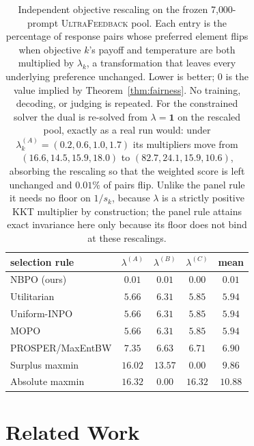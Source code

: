 \documentclass{article}
\theoremstyle{remark}
\theoremstyle{plain}
\newcommand{\NBPO}{\textsc{NBPO}}
\begin{document}
\begin{table}[htbp]
\centering\footnotesize
\setlength{\tabcolsep}{4.0pt}
\caption{Independent objective rescaling on the frozen 7{,}000-prompt \textsc{UltraFeedback} pool. Each entry is the percentage of response pairs whose preferred element flips when objective $k$'s payoff and temperature are both multiplied by $\lambda_k$, a transformation that leaves every underlying preference unchanged. Lower is better; $0$ is the value implied by Theorem~\ref{thm:fairness}. No training, decoding, or judging is repeated. For the constrained solver the dual is re-solved from $\lambda=\mathbf 1$ on the rescaled pool, exactly as a real run would: under $\lambda_k^{(A)}=(0.2,0.6,1.0,1.7)$ its multipliers move from $(16.6,14.5,15.9,18.0)$ to $(82.7,24.1,15.9,10.6)$, absorbing the rescaling so that the weighted score is left unchanged and $0.01\%$ of pairs flip. Unlike the panel rule it needs no floor on $1/s_k$, because $\lambda$ is a strictly positive KKT multiplier by construction; the panel rule attains exact invariance here only because its floor does not bind at these rescalings.}
\label{tab:uf-scale-covariance}
\begin{tabular}{lcccc}
\toprule
selection rule & $\lambda^{(A)}$ & $\lambda^{(B)}$ & $\lambda^{(C)}$ & mean\\
\midrule
\NBPO{} (ours) & $\mathbf{0.01}$ & $\mathbf{0.01}$ & $\mathbf{0.00}$ & $\mathbf{0.01}$\\
Utilitarian & $5.66$ & $6.31$ & $5.85$ & $5.94$\\
Uniform-INPO & $5.66$ & $6.31$ & $5.85$ & $5.94$\\
MOPO & $5.66$ & $6.31$ & $5.85$ & $5.94$\\
PROSPER/MaxEntBW & $7.35$ & $6.63$ & $6.71$ & $6.90$\\
Surplus maxmin & $16.02$ & $13.57$ & $0.00$ & $9.86$\\
Absolute maxmin & $16.32$ & $0.00$ & $16.32$ & $10.88$\\
\bottomrule
\end{tabular}
\end{table}

\section{Related Work}
\label{sec:related}
\end{document}
